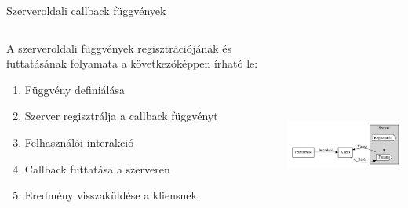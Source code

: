 \documentclass[english, aspectratio=169]{beamer}
\begin{document}
	\begin{frame}{Szerveroldali callback függvények}
		\begin{columns}
			\begin{column}{.5\textwidth}
					A szerveroldali függvények regisztrációjának és futtatásának folyamata a következőképpen írható le:
				\begin{enumerate}
					\item Függvény definiálása
					\item Szerver regisztrálja a callback függvényt
					\item Felhasználói interakció
					\item Callback futtatása a szerveren
					\item Eredmény visszaküldése a kliensnek
				\end{enumerate}
			\end{column}
			\begin{column}{.5\textwidth}
				\begin{center}
					\includegraphics[width=7cm, height=7cm, keepaspectratio]{graphs/adv_1.png}
				\end{center}	
			\end{column}
		\end{columns}
	\end{frame}
	
\end{document}
